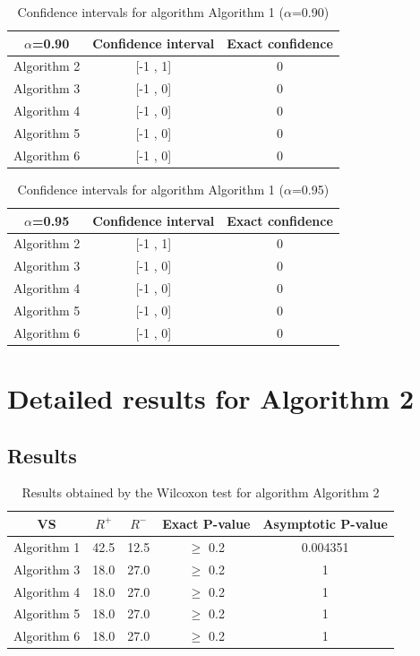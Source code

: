 \documentclass[a4paper,10pt]{article}
\begin{document}
\begin{table}[!htp]
\centering\small
\begin{tabular}{
|c|c|c|}
\hline
 $\alpha$=0.90 & Confidence interval & Exact confidence \\ \hline 
Algorithm 2 & [-1 , 1] & 0\\ \hline 
Algorithm 3 & [-1 , 0] & 0\\ \hline 
Algorithm 4 & [-1 , 0] & 0\\ \hline 
Algorithm 5 & [-1 , 0] & 0\\ \hline 
Algorithm 6 & [-1 , 0] & 0\\ \hline 

\end{tabular}
\caption{Confidence intervals for algorithm Algorithm 1 ($\alpha$=0.90)}
\end{table}
\begin{table}[!htp]
\centering\small
\begin{tabular}{
|c|c|c|}
\hline
 $\alpha$=0.95 & Confidence interval & Exact confidence \\ \hline 
Algorithm 2 & [-1 , 1] & 0\\ \hline 
Algorithm 3 & [-1 , 0] & 0\\ \hline 
Algorithm 4 & [-1 , 0] & 0\\ \hline 
Algorithm 5 & [-1 , 0] & 0\\ \hline 
Algorithm 6 & [-1 , 0] & 0\\ \hline 

\end{tabular}
\caption{Confidence intervals for algorithm Algorithm 1 ($\alpha$=0.95)}
\end{table}

 \clearpage 


\section{Detailed results for Algorithm 2}


\subsection{Results}

\begin{table}[!htp]
\centering\small
\begin{tabular}{
|c|c|c|c|c|}
\hline
 VS & $R^{+}$ & $R^{-}$ & Exact P-value & Asymptotic P-value \\ \hline 
Algorithm 1 & 42.5 & 12.5 & $\geq$ 0.2 & 0.004351\\ \hline 
Algorithm 3 & 18.0 & 27.0 & $\geq$ 0.2 & 1\\ \hline 
Algorithm 4 & 18.0 & 27.0 & $\geq$ 0.2 & 1\\ \hline 
Algorithm 5 & 18.0 & 27.0 & $\geq$ 0.2 & 1\\ \hline 
Algorithm 6 & 18.0 & 27.0 & $\geq$ 0.2 & 1\\ \hline 

\end{tabular}
\caption{Results obtained by the Wilcoxon test for algorithm Algorithm 2}
\end{table}
\end{document}
